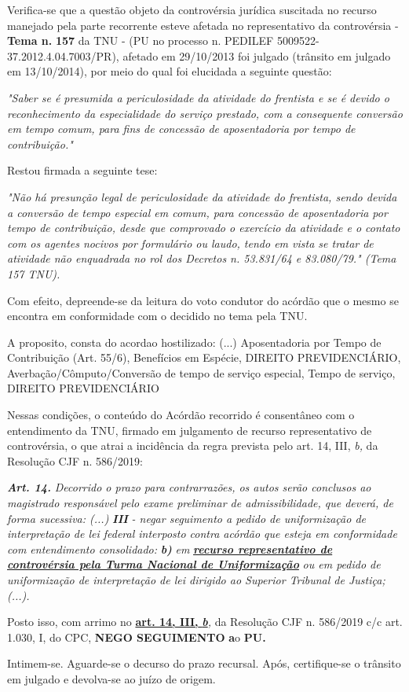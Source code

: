 \documentclass[12pt]{article}
\begin{document}
\justifying
\noindent Verifica-se que a questão objeto da controvérsia jurídica suscitada no recurso manejado pela parte recorrente esteve afetada no representativo da controvérsia - \textbf{Tema n. }\textbf{157} da TNU - (PU no processo n. PEDILEF 5009522-37.2012.4.04.7003/PR),  afetado em 29/10/2013 foi julgado (trânsito em julgado em 13/10/2014), por meio do qual foi elucidada a seguinte questão:

\noindent \textit{"Saber se é presumida a periculosidade da atividade do frentista e se é devido o reconhecimento da especialidade do serviço prestado, com a consequente conversão em tempo comum, para fins de concessão de aposentadoria por tempo de contribuição."}

\noindent Restou firmada a seguinte tese:

\noindent \textit{"Não há presunção legal de periculosidade da atividade do frentista, sendo devida a conversão de tempo especial em comum, para concessão de aposentadoria por tempo de contribuição, desde que comprovado o exercício da atividade e o contato com os agentes nocivos por formulário ou laudo, tendo em vista se tratar de atividade não enquadrada no rol dos Decretos n. 53.831/64 e 83.080/79." (Tema 157 TNU).}

\noindent Com efeito, depreende-se da leitura do voto condutor do acórdão que o mesmo se encontra em conformidade com o decidido no  tema pela TNU.

\noindent A proposito, consta do acordao hostilizado: (...) Aposentadoria por Tempo de Contribuição (Art. 55/6), Benefícios em Espécie, DIREITO PREVIDENCIÁRIO, Averbação/Cômputo/Conversão de tempo de serviço especial, Tempo de serviço, DIREITO PREVIDENCIÁRIO

\noindent Nessas condições, o conteúdo do Acórdão recorrido é consentâneo com o entendimento da TNU, firmado em julgamento de recurso representativo de controvérsia, o que atrai a incidência da regra prevista pelo art. 14, III, \textit{b,} da Resolução CJF n. 586/2019:

\noindent \textit{\textbf{Art. 14.}}\textit{ Decorrido o prazo para contrarrazões, os autos serão conclusos ao magistrado responsável pelo exame preliminar de admissibilidade, que deverá, de forma sucessiva: (...) }\textit{\textbf{III }}\textit{- negar seguimento a pedido de uniformização de interpretação de lei federal interposto contra acórdão que esteja em conformidade com entendimento consolidado: }\textit{\textbf{b)}}\textit{ em }\uline{\textit{\textbf{recurso representativo de controvérsia pela Turma Nacional de Uniformização}}}\textit{ ou em pedido de uniformização de interpretação de lei dirigido ao Superior Tribunal de Justiça;(...).}

\noindent Posto isso, com arrimo no \uline{\textbf{art. 14, III, }}\uline{\textit{\textbf{b}}}\textit{,} da Resolução CJF n. 586/2019 c/c art. 1.030, I, do CPC, \textbf{NEGO SEGUIMENTO }\textbf{a}o\textbf{ PU}\textbf{.}

\noindent Intimem-se. Aguarde-se o decurso do prazo recursal. Após, certifique-se o trânsito em julgado e devolva-se ao juízo de origem.
\end{document}
